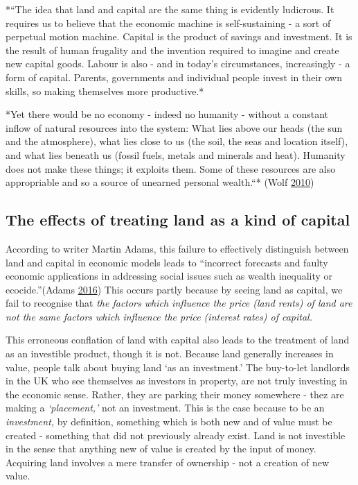 \documentclass[]{tufte-handout}
\begin{document}
*``The idea that land and capital are the same thing is evidently
ludicrous. It requires us to believe that the economic machine is
self-sustaining - a sort of perpetual motion machine. Capital is the
product of savings and investment. It is the result of human frugality
and the invention required to imagine and create new capital goods.
Labour is also - and in today's circumstances, increasingly - a form of
capital. Parents, governments and individual people invest in their own
skills, so making themselves more productive.*

*Yet there would be no economy - indeed no humanity - without a constant
inflow of natural resources into the system: What lies above our heads
(the sun and the atmosphere), what lies close to us (the soil, the seas
and location itself), and what lies beneath us (fossil fuels, metals and
minerals and heat). Humanity does not make these things; it exploits
them. Some of these resources are also appropriable and so a source of
unearned personal wealth.``* (Wolf
\protect\hyperlink{ref-Wolf2010}{2010})

\hypertarget{the-effects-of-treating-land-as-a-kind-of-capital}{%
\subsection{The effects of treating land as a kind of
capital}\label{the-effects-of-treating-land-as-a-kind-of-capital}}

According to writer Martin Adams, this failure to effectively
distinguish between land and capital in economic models leads to
``incorrect forecasts and faulty economic applications in addressing
social issues such as wealth inequality or ecocide.''(Adams
\protect\hyperlink{ref-Adams2016}{2016}) This occurs partly because by
seeing land as capital, we fail to recognise that \emph{the factors
which influence the price (land rents) of land are not the same factors
which influence the price (interest rates) of capital.}

This erroneous conflation of land with capital also leads to the
treatment of land as an investible product, though it is not. Because
land generally increases in value, people talk about buying land `as an
investment.' The buy-to-let landlords in the UK who see themselves as
investors in property, are not truly investing in the economic sense.
Rather, they are parking their money somewhere - thez are making a
\emph{`placement,'} not an investment. This is the case because to be an
\emph{investment,} by definition, something which is both new and of
value must be created - something that did not previously already exist.
Land is not investible in the sense that anything new of value is
created by the input of money. Acquiring land involves a mere transfer
of ownership - not a creation of new value.
\end{document}
